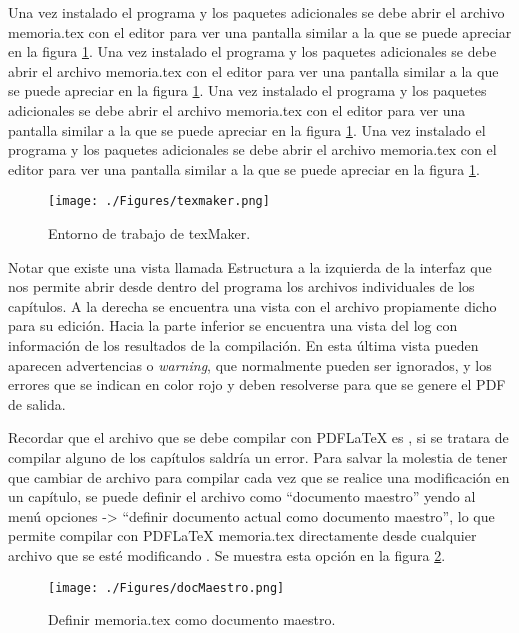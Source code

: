 Una vez instalado el programa y los paquetes adicionales se debe abrir el archivo memoria.tex con el editor para ver una pantalla similar a la que se puede apreciar en la figura \ref{fig:texmaker}. 
Una vez instalado el programa y los paquetes adicionales se debe abrir el archivo memoria.tex con el editor para ver una pantalla similar a la que se puede apreciar en la figura \ref{fig:texmaker}. 
Una vez instalado el programa y los paquetes adicionales se debe abrir el archivo memoria.tex con el editor para ver una pantalla similar a la que se puede apreciar en la figura \ref{fig:texmaker}. 
Una vez instalado el programa y los paquetes adicionales se debe abrir el archivo memoria.tex con el editor para ver una pantalla similar a la que se puede apreciar en la figura \ref{fig:texmaker}. 

\vspace{1cm}

\begin{figure}[htbp]
	\centering
	\texttt{[image: ./Figures/texmaker.png]}
	\caption{Entorno de trabajo de texMaker.}
	\label{fig:texmaker}
\end{figure}

\vspace{1cm}

Notar que existe una vista llamada Estructura a la izquierda de la interfaz que nos permite abrir desde dentro del programa los archivos individuales de los capítulos.  A la derecha se encuentra una vista con el archivo propiamente dicho para su edición. Hacia la parte inferior se encuentra una vista del log con información de los resultados de la compilación.  En esta última vista pueden aparecen advertencias o \textit{warning}, que normalmente pueden ser ignorados, y los errores que se indican en color rojo y deben resolverse para que se genere el PDF de salida.

Recordar que el archivo que se debe compilar con PDFLaTeX es , si se tratara de compilar alguno de los capítulos saldría un error.  Para salvar la molestia de tener que cambiar de archivo para compilar cada vez que se realice una modificación en un capítulo, se puede definir el archivo  como ``documento maestro'' yendo al menú opciones -> ``definir documento actual como documento maestro'', lo que permite compilar con PDFLaTeX memoria.tex directamente desde cualquier archivo que se esté modificando . Se muestra esta opción en la figura \ref{fig:docMaestro}.

\begin{figure}[h]
	\centering
	\texttt{[image: ./Figures/docMaestro.png]}
	\caption{Definir memoria.tex como documento maestro.}
	\label{fig:docMaestro}
\end{figure}

